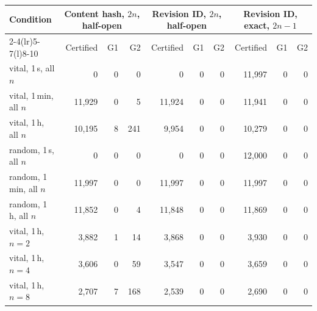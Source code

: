 \begin{tabular}{@{}lrrrrrrrrr@{}}
\toprule
Condition & \multicolumn{3}{c}{Content hash, $2n$, half-open} & \multicolumn{3}{c}{Revision ID, $2n$, half-open} & \multicolumn{3}{c}{Revision ID, exact, $2n{-}1$} \\ \cmidrule(lr){2-4}\cmidrule(lr){5-7}\cmidrule(l){8-10}
 & Certified & G1 & G2 & Certified & G1 & G2 & Certified & G1 & G2 \\
\midrule
vital, 1\,s, all $n$ & 0 & 0 & 0 & 0 & 0 & 0 & 11,997 & 0 & 0 \\
vital, 1\,min, all $n$ & 11,929 & 0 & 5 & 11,924 & 0 & 0 & 11,941 & 0 & 0 \\
vital, 1\,h, all $n$ & 10,195 & 8 & 241 & 9,954 & 0 & 0 & 10,279 & 0 & 0 \\
random, 1\,s, all $n$ & 0 & 0 & 0 & 0 & 0 & 0 & 12,000 & 0 & 0 \\
random, 1\,min, all $n$ & 11,997 & 0 & 0 & 11,997 & 0 & 0 & 11,997 & 0 & 0 \\
random, 1\,h, all $n$ & 11,852 & 0 & 4 & 11,848 & 0 & 0 & 11,869 & 0 & 0 \\
\midrule
vital, 1\,h, $n=2$ & 3,882 & 1 & 14 & 3,868 & 0 & 0 & 3,930 & 0 & 0 \\
vital, 1\,h, $n=4$ & 3,606 & 0 & 59 & 3,547 & 0 & 0 & 3,659 & 0 & 0 \\
vital, 1\,h, $n=8$ & 2,707 & 7 & 168 & 2,539 & 0 & 0 & 2,690 & 0 & 0 \\
\bottomrule
\end{tabular}
